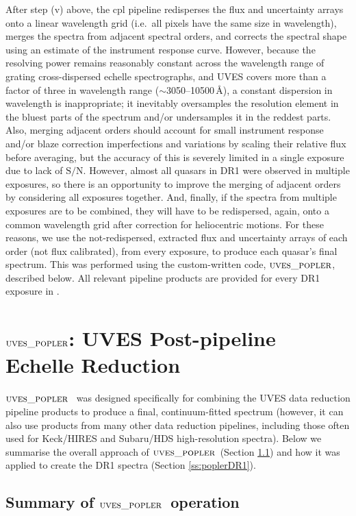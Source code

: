 \documentclass[fleqn,usenatbib,usedcolumn]{mnras}
\newcommand{\Sref}[1]{Section \ref{#1}}
\newcommand{\SN}{\ensuremath{\textrm{S/N}}}
\newcommand{\popler}{\ensuremath{\textsc{uves\_popler}}}
\begin{document}
After step (v) above, the {\sc cpl} pipeline redisperses the flux and uncertainty arrays onto a linear wavelength grid (i.e.\ all pixels have the same size in wavelength), merges the spectra from adjacent spectral orders, and corrects the spectral shape using an estimate of the instrument response curve. However, because the resolving power remains reasonably constant across the wavelength range of grating cross-dispersed echelle spectrographs, and UVES covers more than a factor of three in wavelength range ($\sim$3050--10500\,\AA), a constant dispersion in wavelength is inappropriate; it inevitably oversamples the resolution element in the bluest parts of the spectrum and/or undersamples it in the reddest parts. Also, merging adjacent orders should account for small instrument response and/or blaze correction imperfections and variations by scaling their relative flux before averaging, but the accuracy of this is severely limited in a single exposure due to lack of \SN. However, almost all quasars in DR1 were observed in multiple exposures, so there is an opportunity to improve the merging of adjacent orders by considering all exposures together. And, finally, if the spectra from multiple exposures are to be combined, they will have to be redispersed, again, onto a common wavelength grid after correction for heliocentric motions. For these reasons, we use the not-redispersed, extracted flux and uncertainty arrays of each order (not flux calibrated), from every exposure, to produce each quasar's final spectrum. This was performed using the custom-written code, \popler, described below. All relevant pipeline products are provided for every DR1 exposure in \citet{Murphy:2018:UVESSQUADDR1}.


\section{\popler: UVES Post-pipeline Echelle Reduction}\label{s:popler}

\popler\ \citep{Murphy:2016:UVESpopler} was designed specifically for combining the UVES data reduction pipeline products to produce a final, continuum-fitted spectrum (however, it can also use products from many other data reduction pipelines, including those often used for Keck/HIRES and Subaru/HDS high-resolution spectra). Below we summarise the overall approach of \popler\ (\Sref{ss:popler_summary}) and how it was applied to create the DR1 spectra (\Sref{ss:poplerDR1}).

\subsection{Summary of \popler\ operation}\label{ss:popler_summary}
\end{document}
